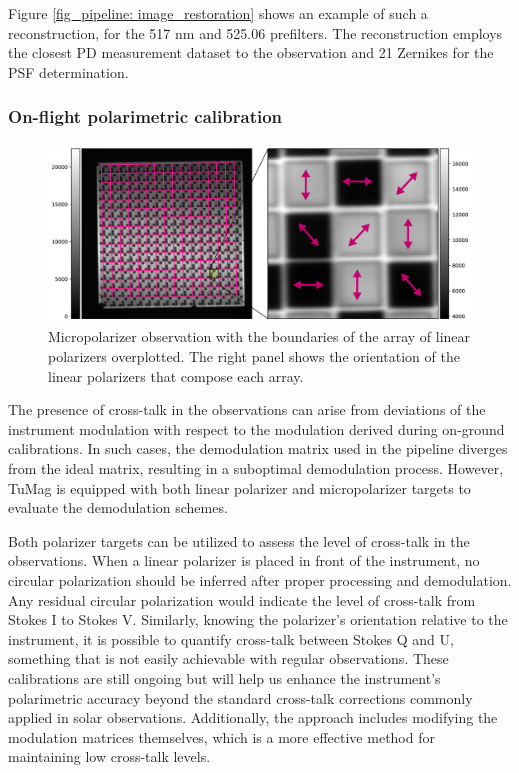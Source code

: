 Figure \ref{fig_pipeline:  image_restoration} shows an example of such a reconstruction, for the 517 nm and 525.06 prefilters. The reconstruction employs the closest PD measurement dataset to the observation and 21 Zernikes for the PSF determination.   

\subsubsection{On-flight polarimetric calibration}
\begin{figure}[t]
  \includegraphics[width=\textwidth]{figures/Pipeline/Micrpols_edit.pdf}
  \caption[Micropolarizer observations.]{
   Micropolarizer observation with the boundaries of the array of linear polarizers overplotted. The right panel shows the orientation of the linear polarizers that compose each array.}
    \label{fig_pipeline: micropols_calib}
\end{figure}

The presence of cross-talk in the observations can arise from deviations of the instrument modulation with respect to the modulation derived during on-ground calibrations. In such cases, the demodulation matrix used in the pipeline diverges from the ideal matrix, resulting in a suboptimal demodulation process. However, TuMag is equipped with both linear polarizer and micropolarizer targets to evaluate the demodulation schemes.

Both polarizer targets can be utilized to assess the level of cross-talk in the observations. When a linear polarizer is placed in front of the instrument, no circular polarization should be inferred after proper processing and demodulation. Any residual circular polarization would indicate the level of cross-talk from Stokes I to Stokes V. Similarly, knowing the polarizer's orientation relative to the instrument, it is possible to quantify cross-talk between Stokes Q and U, something that is not easily achievable with regular observations. These calibrations are still ongoing but will help us enhance the instrument's polarimetric accuracy beyond the standard cross-talk corrections commonly applied in solar observations. Additionally, the approach includes modifying the modulation matrices themselves, which is a more effective method for maintaining low cross-talk levels.

